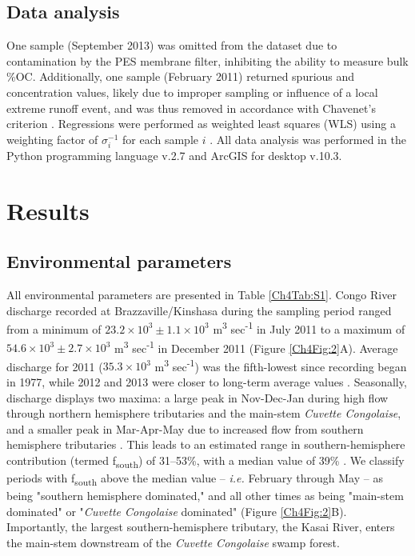 \subsection{Data analysis}

One sample (September 2013) was omitted from the dataset due to contamination by the PES membrane filter, inhibiting the ability to measure bulk \%OC. Additionally, one sample (February 2011) returned spurious  and concentration values, likely due to improper sampling or influence of a local extreme runoff event, and was thus removed in accordance with Chavenet's criterion \citep{Glover:2011tl}. Regressions were performed as weighted least squares (WLS) using a weighting factor of $\sigma^{-1}_{i}$ for each sample $i$ \citep{Glover:2011tl}. All data analysis was performed in the Python programming language v.2.7 and ArcGIS for desktop v.10.3.

\section{Results}

\subsection{Environmental parameters}

All environmental parameters are presented in Table \ref{Ch4Tab:S1}. Congo River discharge recorded at Brazzaville/Kinshasa during the sampling period ranged from a minimum of $23.2 \times 10^3 \pm 1.1 \times 10^3$ m\textsuperscript{3} sec\textsuperscript{-1} in July 2011 to a maximum of $54.6 \times 10^3 \pm 2.7 \times 10^3$ m\textsuperscript{3} sec\textsuperscript{-1} in December 2011 (Figure \ref{Ch4Fig:2}A). Average discharge for 2011 ($35.3 \times 10^3$ m\textsuperscript{3} sec\textsuperscript{-1}) was the fifth-lowest since recording began in 1977, while 2012 and 2013 were closer to long-term average values \citep{Spencer:2012en}. Seasonally, discharge displays two maxima: a large peak in Nov-Dec-Jan during high flow through northern hemisphere tributaries and the main-stem \textit{Cuvette Congolaise}, and a smaller peak in Mar-Apr-May due to increased flow from southern hemisphere tributaries \citep{Bricquet:1993ve,Coynel:2005cn,Bouillon:2012cw,Spencer:2012en,Spencer:2014vp}. This leads to an estimated range in southern-hemisphere contribution (termed f\textsubscript{south}) of 31--53\%, with a median value of 39\% \citep{Bricquet:1993ve}. We classify periods with f\textsubscript{south} above the median value -- \textit{\textit{i.e.}} February through May -- as being "southern hemisphere dominated," and all other times as being "main-stem dominated" or "\textit{Cuvette Congolaise} dominated" (Figure \ref{Ch4Fig:2}B). Importantly, the largest southern-hemisphere tributary, the Kasai River, enters the main-stem downstream of the \textit{Cuvette Congolaise} swamp forest.

